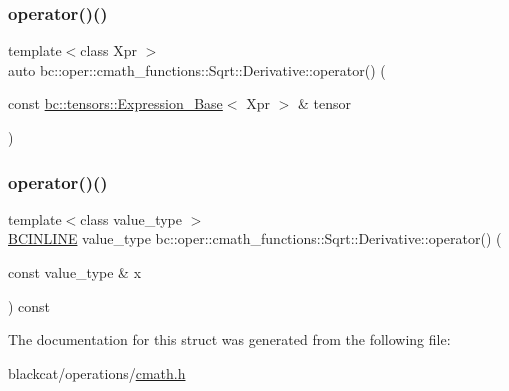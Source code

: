 \mbox{\label{structbc_1_1oper_1_1cmath__functions_1_1Sqrt_1_1Derivative_aaeb593258823b5a70e4290e17836eaf6}} 
\subsubsection{\texorpdfstring{operator()()}{operator()()}\hspace{0.1cm}{\footnotesize\ttfamily [2/3]}}
{\footnotesize\ttfamily template$<$class Xpr $>$ \\
auto bc\+::oper\+::cmath\+\_\+functions\+::\+Sqrt\+::\+Derivative\+::operator() (\begin{DoxyParamCaption}\item[{const \hyperlink{classbc_1_1tensors_1_1Expression__Base}{bc\+::tensors\+::\+Expression\+\_\+\+Base}$<$ Xpr $>$ \&}]{tensor }\end{DoxyParamCaption})\hspace{0.3cm}{\ttfamily [inline]}}

\mbox{\label{structbc_1_1oper_1_1cmath__functions_1_1Sqrt_1_1Derivative_af367bf217161dea016fa8d70ed74bc48}} 
\subsubsection{\texorpdfstring{operator()()}{operator()()}\hspace{0.1cm}{\footnotesize\ttfamily [3/3]}}
{\footnotesize\ttfamily template$<$class value\+\_\+type $>$ \\
\hyperlink{common_8h_a6699e8b0449da5c0fafb878e59c1d4b1}{B\+C\+I\+N\+L\+I\+NE} value\+\_\+type bc\+::oper\+::cmath\+\_\+functions\+::\+Sqrt\+::\+Derivative\+::operator() (\begin{DoxyParamCaption}\item[{const value\+\_\+type \&}]{x }\end{DoxyParamCaption}) const\hspace{0.3cm}{\ttfamily [inline]}}



The documentation for this struct was generated from the following file\+:\begin{DoxyCompactItemize}
\item 
blackcat/operations/\hyperlink{cmath_8h}{cmath.\+h}\end{DoxyCompactItemize}
